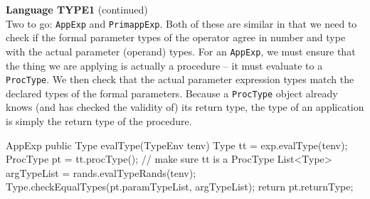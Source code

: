 \begin{minipage}[t]{\sw}
\slidenumber
\LARGE
{\bf Language TYPE1} (continued)\\[1.5ex]
Two to go: \verb'AppExp' and \verb'PrimappExp'.
Both of these are similar
in that we need to check if the formal parameter types of the operator
agree in number and type with the actual parameter (operand) types.\exx
For an \verb'AppExp', we must ensure
that the thing we are applying is actually a procedure --
it must evaluate to a \verb'ProcType'.
We then check that the actual parameter expression types
match the declared types of the formal parameters.
Because a \verb'ProcType' object already knows
(and has checked the validity of) its return type,
the type of an application is simply the return type of the procedure.
\Large
\begin{qv}
AppExp
    public Type evalType(TypeEnv tenv) {
        Type tt = exp.evalType(tenv);
        ProcType pt = tt.procType(); // make sure tt is a ProcType
        List<Type> argTypeList = rands.evalTypeRands(tenv);
        Type.checkEqualTypes(pt.paramTypeList, argTypeList);
        return pt.returnType;
    }
\end{qv}
\end{minipage}
